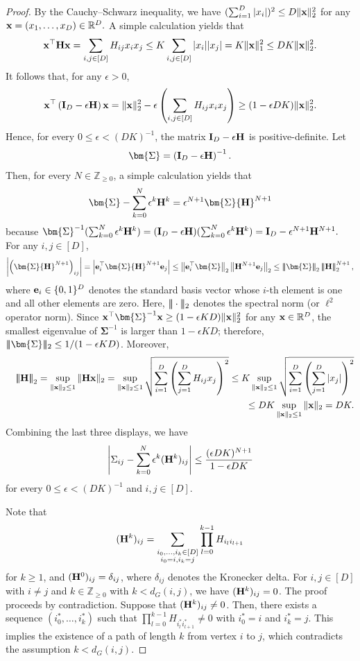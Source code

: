 \documentclass[11pt,a4paper,final]{article}
\numberwithin{equation}{section}
\theoremstyle{remark}
\newcommand{\bfe}{{\bf e}}
\newcommand{\bH}{{\bf H}}
\newcommand{\bI}{{\bf I}}
\newcommand{\bx}{{\bf x}}
\newcommand{\bbR}{{\mathbb R}}
\newcommand{\bbZ}{{\mathbb Z}}
\newcommand{\bSigma}{\bm{\Sigma}}
\newcommand{\be}{\begin{equation}}
\newcommand{\ee}{\end{equation}}
\newcommand{\bean}{\setlength\arraycolsep{1pt}\begin{eqnarray*}}
\newcommand{\eean}{\end{eqnarray*}}
\newcommand{\tnorm}[1]{\vert\mkern-3mu\vert\mkern-3mu\vert #1 \vert\mkern-3mu\vert\mkern-3mu\vert}
\newcommand{\Tnorm}[1]{\left\vert\mkern-3mu\left\vert\mkern-3mu\left\vert #1 \right\vert\mkern-3mu\right\vert\mkern-3mu\right\vert}
\begin{document}
\begin{proof}
By the Cauchy–Schwarz inequality, we have $(\sum_{i=1}^{D} \vert x_i \vert)^2 \leq D \| \bx \|_2^2$ for any $\bx = (x_1,\ldots,x_{D}) \in \bbR^{D}.$
A simple calculation yields that
\bean
\bx^{\top} \bH \bx  = \sum_{i,j \in [D]} H_{ij} x_{i} x_{j}
\leq K  \sum_{i,j \in [D]} \vert x_i \vert \vert x_j \vert = K \| \bx \|_1^2 \leq D K \| \bx \|_2^2.
\eean
It follows that, for any $\epsilon > 0$,
\bean
\bx^{\top} \left( \bI_{D} - \epsilon \bH \right) \bx 
= \| \bx \|_2^2 - \epsilon \left( \sum_{i,j \in [D]} H_{ij} x_i x_j \right)
\geq (1-\epsilon D K)  \| \bx \|_2^2.
\eean
Hence, for every $0 \leq \epsilon < (DK)^{-1}$, the matrix $\bI_{D}-\epsilon \bH$ is positive-definite.
Let
\bean
\bSigma
=
\left( \bI_{D} - \epsilon \bH \right)^{-1}.
\eean
Then, for every $N \in \bbZ_{\geq 0}$, a simple calculation yields that
\bean
\bSigma - \sum_{k=0}^{N} \epsilon^{k} \bH^{k} = \epsilon^{N+1} \bSigma \bH^{N+1}
\eean
because $ \bSigma^{-1}  (\sum_{k=0}^{N} \epsilon^{k} \bH^{k} ) = ( \bI_{D} - \epsilon \bH ) (\sum_{k=0}^{N} \epsilon^{k} \bH^{k} )
= \bI_{D} - \epsilon^{N+1} \bH^{N+1}.$
For any $i,j \in [D]$,
\bean
\left\vert \left( \bSigma \bH^{N+1} \right)_{ij} \right\vert
= \left\vert \bfe_{i}^{\top} \bSigma \bH^{N+1} \bfe_{j} \right\vert
\leq \left\| \bfe_{i}^{\top} \bSigma \right\|_2
\left\| \bH^{N+1} \bfe_{j} \right\|_2
\leq \Tnorm{  \bSigma }_{2} \Tnorm{ \bH }_2^{N+1},
\eean
where $\bfe_{i} \in \{0,1\}^{D}$ denotes the standard basis vector whose $i$-th element is one and all other elements are zero.
Here, $\tnorm{\cdot}_2$ denotes the spectral norm  (or $\ell^2$ operator norm).
Since $\bx^{\top} \bSigma^{-1} \bx \geq (1-\epsilon KD) \| \bx \|_2^2$ for any $\bx \in \bbR^{D}$, the smallest eigenvalue of $\bSigma^{-1}$ is larger than $1-\epsilon  K D$; therefore, $ \tnorm{\bSigma}_2 \leq 1/(1-\epsilon KD)$.
Moreover, 
\bean
&& \Tnorm{\bH}_2 = \sup_{\| \bx \|_2 \leq 1} \| \bH \bx \|_2 = \sup_{\| \bx \|_2 \leq 1} \sqrt{ \sum_{i=1}^{D} \left( \sum_{j=1}^{D} H_{ij} x_j \right)^2 } \leq K \sup_{\| \bx \|_2 \leq 1} \sqrt{ \sum_{i=1}^{D} \left( \sum_{j=1}^{D} \vert x_j \vert \right)^2 }
\\
&& \leq D K \sup_{\| \bx \|_2 \leq 1} \| \bx \|_2 = DK.
\eean
Combining the last three displays, we have
\be
\left\vert \Sigma_{ij} - \sum_{k=0}^{N} \epsilon^{k} (\bH^{k})_{ij} \right\vert
\leq \frac{(\epsilon D K)^{N+1}}{1-\epsilon D K}
\label{eqlem1:errorbd}
\ee
for every $0 \leq \epsilon < (DK)^{-1}$ and $i,j \in [D]$.

Note that
\bean
(\bH^{k})_{ij} = \sum_{ \substack {i_0,\ldots,i_{k} \in [D] \\ i_0 = i, i_k = j }}  \prod_{l=0}^{k-1} H_{i_{l} i_{l+1} }
\eean
for $k \geq 1$, and $(\bH^{0})_{ij} = \delta_{ij}$, where $\delta_{ij}$ denotes the Kronecker delta.
For $i,j \in [D]$ with $i \neq j$ and $k \in \bbZ_{\geq 0}$ with $k < d_{G}(i,j)$, we have $(\bH^{k})_{ij} = 0$.
The proof proceeds by contradiction.
Suppose that $(\bH^k)_{ij} \neq 0$.
Then, there exists a sequence $(i^*_{0},\ldots,i^*_{k})$ such that $\prod_{l=0}^{k-1} H_{i^*_l i^*_{l+1}} \neq 0$ with $i_0^{*} = i$ and $i_{k}^{*} = j$.
This implies the existence of a path of length $k$ from vertex $i$ to $j$, which contradicts the assumption $k < d_{G}(i,j)$. 


\end{proof}
\end{document}

